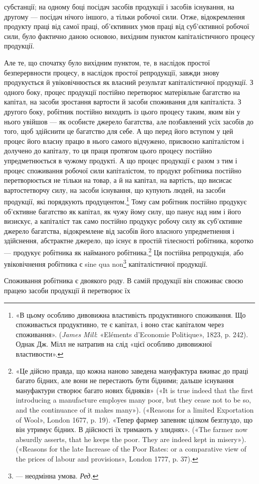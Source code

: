 \parcont{}  %
субстанції; на одному боці посідач засобів продукції і засобів
існування, на другому — посідач нічого іншого, а тільки робочої
сили. Отже, відокремлення продукту праці від самої праці, об’єктивних
умов праці від суб’єктивної робочої сили, було фактично
даною основою, вихідним пунктом капіталістичного процесу
продукції.

Але те, що спочатку було вихідним пунктом, те, в наслідок
простої безперервности процесу, в наслідок простої репродукції,
завжди знову продукується й увіковічнюється як власний результат
капіталістичної продукції. З одного боку, процес продукції
постійно перетворює матеріяльне багатство на капітал,
на засоби зростання вартости й засоби споживання для капіталіста.
З другого боку, робітник постійно виходить із цього процесу
таким, яким він у нього увійшов — як особисте джерело
багатства, але позбавлений усіх засобів до того, щоб здійснити
це багатство для себе. А що перед його вступом у цей процес
його власну працю в нього самого відчужено, присвоєно капіталістом
і долучено до капіталу, то ця праця протягом цього процесу
постійно упредметнюється в чужому продукті. А що процес
продукції є разом з тим і процес споживання робочої сили капіталістом,
то продукт робітника постійно перетворюється не
тільки на товар, а й на капітал, на вартість, що висисає вартостетворчу
силу, на засоби існування, що купують людей, на засоби
продукції, які порядкують продуцентом.\footnote{
«В цьому особливо дивовижна властивість продуктивного споживання.
Що споживається продуктивно, те є капітал, і воно стає капіталом
через споживання». (\emph{James Mill}: «Eléments d’Economie Politique», 1823,
p. 242). Однак Дж. Мілл не натрапив на слід «цієї особливо дивовижної
властивости».
} Тому сам робітник
постійно продукує об’єктивне багатство як капітал, як чужу
йому силу, що панує над ним і його визискує, а капіталіст так
само постійно продукує робочу силу як суб’єктивне джерело
багатства, відокремлене від засобів його власного упредметнення
і здійснення, абстрактне джерело, що існує в простій тілесності
робітника, коротко — продукує робітника як найманого робітника.\footnote{
«Це дійсно правда, що кожна наново заведена мануфактура вживає
до праці багато бідних, але вони не перестають бути бідними; дальше
існування мануфактури створює багато нових бідняків» («It is true indeed
that the first introducing a manufacture employes many poor, but
they cease not to be so, and the continuance of it makes many»). («Reasons
for a limited Exportation of Wool», London 1677, p. 19). «Тепер фармер
запевняє цілком безглуздо, що він утримує бідних. В дійсності їх тримають
у злиднях». («The farmer now absurdly asserts, that he keeps the
poor. They are indeed kept in misery»). («Reasons for the late Increase
of the Poor Rates: or a comparative view of the prices of labour and provisions»,
London 1777, p. 37).
}
Ця постійна репродукція, або увіковічнення робітника
є sine qua non\footnote*{
— неодмінна умова. \emph{Ред.}
} капіталістичної продукції.

Споживання робітника є двоякого роду. В самій продукції
він споживає своєю працею засоби продукції й перетворює їх
\parbreak{}  %
